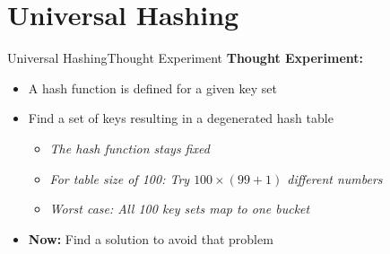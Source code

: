 \section{Universal Hashing}

\def\E{\mathbb{E}}

\begin{frame}{Universal Hashing}{Thought Experiment}
  \textbf{Thought Experiment:}\\
  \begin{itemize}
    \item<1->
      A {\color{MainA}hash function} is defined for a given
      {\color{MainA}key set}
    \item<2->
      Find a {\color{MainA}set of keys} resulting in a degenerated
      {\color{MainA}hash table}
      \begin{itemize}
        \item<3->\textit{The {\color{MainA}hash function} stays fixed}\\
        \item<4->\textit{For table size of 100: Try $100 \times (99 + 1)$ different numbers}\\
       \item<5->\textit{Worst case: All 100 {\color{MainA}key sets} map to
         one bucket}
      \end{itemize}
    \item<5->
      \textbf{Now:} Find a solution to avoid that problem
  \end{itemize}
\end{frame}


